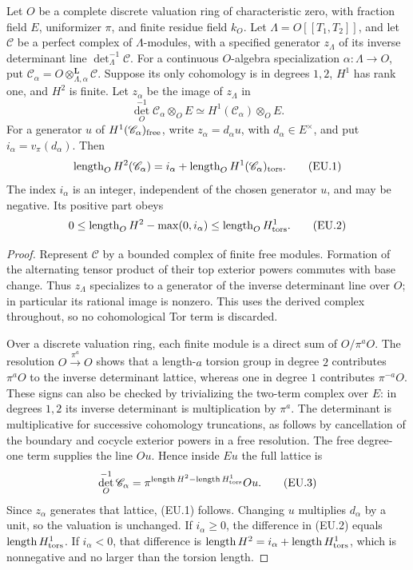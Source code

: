 \begin{lemma}
\label{AC-K26}
Let $O$ be a complete discrete valuation ring of
characteristic zero, with fraction field $E$, uniformizer
$\pi$, and finite residue field $k_O$.
Let $\Lambda=O[[T_1,T_2]]$, and let $\mathscr C$ be a
perfect complex of $\Lambda$-modules, with a specified
generator $z_\Lambda$ of its inverse determinant line
$\det_\Lambda^{-1}\mathscr C$.
For a continuous $O$-algebra specialization
$\alpha:\Lambda\to O$, put
$\mathscr C_\alpha=O\otimes^\mathbf L_{\Lambda,\alpha}\mathscr C$.
Suppose its only cohomology is in degrees $1,2$,
$H^1$ has rank one, and $H^2$ is finite.
Let $z_\alpha$ be the image of $z_\Lambda$ in
\[
 \det_O^{-1}\mathscr C_\alpha\otimes_O E
                       \simeq H^1(\mathscr C_\alpha)\otimes_O E.
\]
For a generator $u$ of $H^1(\mathscr C_\alpha)_{\rm free}$,
write $z_\alpha=d_\alpha u$, with $d_\alpha\in E^\times$,
and put $i_\alpha=v_\pi(d_\alpha)$.  Then
\[
 \operatorname{length}_O H^2(\mathscr C_\alpha)
   =i_\alpha+
           \operatorname{length}_O H^1(\mathscr C_\alpha)_{\rm tors}.
                                                            \tag{EU.1}
\]
The index $i_\alpha$ is an integer, independent of
the chosen generator $u$, and may be negative.
Its positive part obeys
\[
 0\leq \operatorname{length}_O H^2-\max(0,i_\alpha)
        \leq\operatorname{length}_O H^1_{\rm tors}.  \tag{EU.2}
\]
\end{lemma}
\begin{proof}
Represent $\mathscr C$ by a bounded complex of finite
free modules.  Formation of the alternating tensor
product of their top exterior powers commutes with
base change.  Thus $z_\Lambda$ specializes to a
generator of the inverse determinant line over $O$;
in particular its rational image is nonzero.
This uses the derived complex throughout, so no
cohomological Tor term is discarded.

Over a discrete valuation ring, each finite module
is a direct sum of $O/\pi^aO$.
The resolution $O\xrightarrow{\pi^a}O$ shows that
a length-$a$ torsion group in degree $2$ contributes
$\pi^aO$ to the inverse determinant lattice, whereas
one in degree $1$ contributes $\pi^{-a}O$.
These signs can also be checked by trivializing the
two-term complex over $E$: in degrees $1,2$ its
inverse determinant is multiplication by $\pi^a$.
The determinant is multiplicative for successive
cohomology truncations, as follows by cancellation
of the boundary and cocycle exterior powers in a
free resolution.  The free degree-one term supplies
the line $Ou$.  Hence inside $Eu$ the full lattice is
\[
 \det_O^{-1}\mathscr C_\alpha
  =\pi^{\operatorname{length}H^2-
                    \operatorname{length}H^1_{\rm tors}}Ou.
                                                            \tag{EU.3}
\]
Since $z_\alpha$ generates that lattice, (EU.1) follows.
Changing $u$ multiplies $d_\alpha$ by a unit, so the
valuation is unchanged.  If $i_\alpha\geq0$, the
difference in (EU.2) equals $\operatorname{length}H^1_{\rm tors}$.
If $i_\alpha<0$, that difference is
$\operatorname{length}H^2=i_\alpha+
\operatorname{length}H^1_{\rm tors}$, which is
nonnegative and no larger than the torsion length.
\end{proof}

